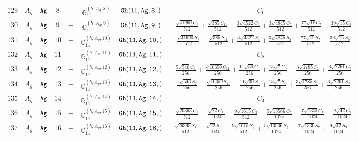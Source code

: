 \documentclass[fleqn,8pt]{jsarticle}
\begin{document}
\begin{table}[ht!]
\begin{center}
\begin{tabular}{cccccccc}
$ 129 $ & $ A_{g} $ & $ {\tt Ag} $ & $ 8 $ & $ - $ & $ \mathbb{G}_{11}^{(h,A_{g},8)} $ & $ {\tt Gh(11,Ag,8,)} $ & $ C_{0} $ \\
$ 130 $ & $ A_{g} $ & $ {\tt Ag} $ & $ 9 $ & $ - $ & $ \mathbb{G}_{11}^{(h,A_{g},9)} $ & $ {\tt Gh(11,Ag,9,)} $ & $ - \frac{\sqrt{41990} C_{1}}{512} + \frac{\sqrt{385} C_{11}}{512} - \frac{3 \sqrt{4522} C_{3}}{512} + \frac{3 \sqrt{4845} C_{5}}{512} + \frac{77 \sqrt{19} C_{7}}{512} + \frac{39 \sqrt{15} C_{9}}{512} $ \\
$ 131 $ & $ A_{g} $ & $ {\tt Ag} $ & $ 10 $ & $ - $ & $ \mathbb{G}_{11}^{(h,A_{g},10)} $ & $ {\tt Gh(11,Ag,10,)} $ & $ - \frac{\sqrt{41990} S_{1}}{512} - \frac{\sqrt{385} S_{11}}{512} + \frac{3 \sqrt{4522} S_{3}}{512} + \frac{3 \sqrt{4845} S_{5}}{512} - \frac{77 \sqrt{19} S_{7}}{512} + \frac{39 \sqrt{15} S_{9}}{512} $ \\
$ 132 $ & $ A_{g} $ & $ {\tt Ag} $ & $ 11 $ & $ - $ & $ \mathbb{G}_{11}^{(h,A_{g},11)} $ & $ {\tt Gh(11,Ag,11,)} $ & $ C_{8} $ \\
$ 133 $ & $ A_{g} $ & $ {\tt Ag} $ & $ 12 $ & $ - $ & $ \mathbb{G}_{11}^{(h,A_{g},12)} $ & $ {\tt Gh(11,Ag,12,)} $ & $ - \frac{5 \sqrt{546} C_{1}}{256} + \frac{\sqrt{10659} C_{11}}{256} + \frac{11 \sqrt{30} C_{3}}{256} + \frac{13 \sqrt{7} C_{5}}{256} - \frac{3 \sqrt{1785} C_{7}}{256} + \frac{3 \sqrt{2261} C_{9}}{256} $ \\
$ 134 $ & $ A_{g} $ & $ {\tt Ag} $ & $ 13 $ & $ - $ & $ \mathbb{G}_{11}^{(h,A_{g},13)} $ & $ {\tt Gh(11,Ag,13,)} $ & $ - \frac{5 \sqrt{546} S_{1}}{256} - \frac{\sqrt{10659} S_{11}}{256} - \frac{11 \sqrt{30} S_{3}}{256} + \frac{13 \sqrt{7} S_{5}}{256} + \frac{3 \sqrt{1785} S_{7}}{256} + \frac{3 \sqrt{2261} S_{9}}{256} $ \\
$ 135 $ & $ A_{g} $ & $ {\tt Ag} $ & $ 14 $ & $ - $ & $ \mathbb{G}_{11}^{(h,A_{g},14)} $ & $ {\tt Gh(11,Ag,14,)} $ & $ C_{4} $ \\
$ 136 $ & $ A_{g} $ & $ {\tt Ag} $ & $ 15 $ & $ - $ & $ \mathbb{G}_{11}^{(h,A_{g},15)} $ & $ {\tt Gh(11,Ag,15,)} $ & $ - \frac{\sqrt{29393} C_{1}}{512} - \frac{\sqrt{22} C_{11}}{1024} - \frac{9 \sqrt{1615} C_{3}}{512} - \frac{5 \sqrt{13566} C_{5}}{1024} - \frac{7 \sqrt{1330} C_{7}}{1024} - \frac{9 \sqrt{42} C_{9}}{1024} $ \\
$ 137 $ & $ A_{g} $ & $ {\tt Ag} $ & $ 16 $ & $ - $ & $ \mathbb{G}_{11}^{(h,A_{g},16)} $ & $ {\tt Gh(11,Ag,16,)} $ & $ \frac{\sqrt{29393} S_{1}}{512} - \frac{\sqrt{22} S_{11}}{1024} - \frac{9 \sqrt{1615} S_{3}}{512} + \frac{5 \sqrt{13566} S_{5}}{1024} - \frac{7 \sqrt{1330} S_{7}}{1024} + \frac{9 \sqrt{42} S_{9}}{1024} $ \\

\end{tabular}
\end{center}
\end{table}
\end{document}
